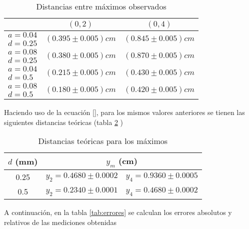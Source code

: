 \documentclass[10pt,a4paper]{article}
\begin{document}
 	\begin{table}[!htb]
 		\centering
 		\caption{Distancias entre máximos observados}
 		\begin{tabular}{|c|c|c|}
 			\hline
 			\backslashbox{$ a, d $ (mm)}{$ (m_1,m_2) $}& $ (0,2) $ & $ (0,4) $ \\
 			\hline
 			$ a=0.04 $ & \multirow{2}{*}{$ (0.395\pm 0.005) cm $} & \multirow{2}{*}{$ (0.845\pm 0.005) cm $} \\ 		
 			$ d=0.25 $ &  & \\ 
 			\hline
 			$ a=0.08 $& \multirow{2}{*}{$ (0.380\pm 0.005) cm $} & \multirow{2}{*}{$ (0.870\pm 0.005) cm $} \\
 			$ d=0.25 $&  &  \\
 			\hline
 			$ a=0.04 $          & \multirow{2}{*}{$ (0.215\pm 0.005) cm $} & \multirow{2}{*}{$ (0.430\pm 0.005) cm $} \\ 		
 			$ d=0.5\phantom{0} $&  &  \\	
 			\hline
 			$ a=0.08 $           & \multirow{2}{*}{$ (0.180 \pm 0.005) cm $} & \multirow{2}{*}{$ (0.420 \pm 0.005) cm $} \\
 			$ d=0.5\phantom{0} $ &  &  \\
 			\hline
 		\end{tabular}
 		\label{tab:distancias}
 	\end{table}
 	
  	Haciendo uso de la ecuación \ref{}, para los mismos valores anteriores se tienen las siguientes distancias teóricas (tabla \ref{tab:disteo} )
 	
 	\begin{table}[!htb]
 		\centering
 		\caption{Distancias teóricas para los máximos}
 		\begin{tabular}{|c|c|c|}
 			\hline
 			$ d $ (mm) & \multicolumn{2}{c|}{$ y_m $ (cm)}  \\
 			\hline
 			0.25 & $ y_2=0.4680\pm 0.0002 $ & $ y_4=0.9360\pm0.0005 $ \\
 			\hline
 			0.5 & $ y_2=0.2340\pm 0.0001 $ & $ y_4=0.4680\pm0.0002 $  \\
 			\hline
 		\end{tabular}
 		\label{tab:disteo}
 	\end{table}
 	
 	A continuación, en la tabla \ref{tab:errores} se calculan los errores absolutos y relativos de las mediciones obtenidas
 	
\end{document}
